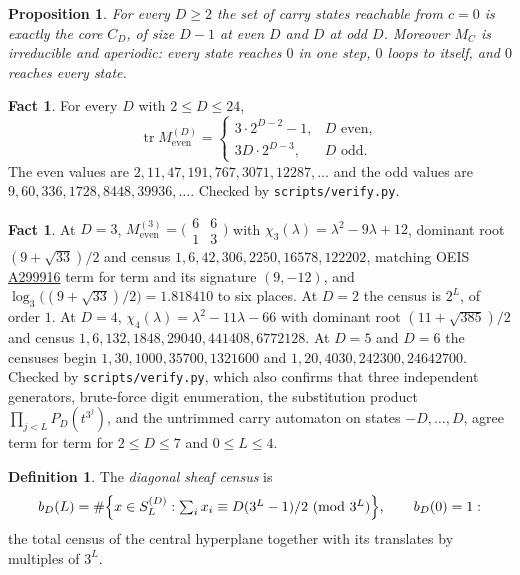 \documentclass[11pt]{amsart}
\newtheorem{proposition}[theorem]{Proposition}
\theoremstyle{definition}
\newtheorem{definition}[theorem]{Definition}
\newtheorem{fact}[theorem]{Fact}
\theoremstyle{remark}
\begin{document}
\begin{proposition}
\label{prop:reach}
For every $D \ge 2$ the set of carry states reachable from $c = 0$ is exactly the core $C_D$, of size $D-1$ at even $D$ and $D$ at odd $D$. Moreover $M_C$ is irreducible and aperiodic: every state reaches $0$ in one step, $0$ loops to itself, and $0$ reaches every state.
\end{proposition}

\begin{fact}
\label{fact:trace}
For every $D$ with $2 \le D \le 24$,
\[
\operatorname{tr} M_{\mathrm{even}}^{(D)} =
\begin{cases}
3 \cdot 2^{D-2} - 1, & D \text{ even}, \\
3D \cdot 2^{D-3}, & D \text{ odd}.
\end{cases}
\]
The even values are $2, 11, 47, 191, 767, 3071, 12287, \dots$ and the odd values are $9, 60, 336, 1728, 8448, 39936, \dots$. Checked by \texttt{scripts/verify.py}.
\end{fact}

\begin{fact}
\label{fact:anchor}
At $D = 3$, $M_{\mathrm{even}}^{(3)} = \bigl(\begin{smallmatrix} 6 & 6 \\ 1 & 3 \end{smallmatrix}\bigr)$ with $\chi_3(\lambda) = \lambda^2 - 9\lambda + 12$, dominant root $(9+\sqrt{33})/2$ and census $1, 6, 42, 306, 2250, 16578, 122202$, matching OEIS \href{https://oeis.org/A299916}{A299916} term for term and its signature $(9,-12)$, and $\log_3\bigl((9+\sqrt{33})/2\bigr) = 1.818410$ to six places. At $D = 2$ the census is $2^L$, of order $1$. At $D = 4$, $\chi_4(\lambda) = \lambda^2 - 11\lambda - 66$ with dominant root $(11+\sqrt{385})/2$ and census $1, 6, 132, 1848, 29040, 441408, 6772128$. At $D = 5$ and $D = 6$ the censuses begin $1, 30, 1000, 35700, 1321600$ and $1, 20, 4030, 242300, 24642700$. Checked by \texttt{scripts/verify.py}, which also confirms that three independent generators, brute-force digit enumeration, the substitution product $\prod_{j<L} P_D(t^{3^j})$, and the untrimmed carry automaton on states $-D,\dots,D$, agree term for term for $2 \le D \le 7$ and $0 \le L \le 4$.
\end{fact}

\begin{definition}
\label{def:sheaf}
The \emph{diagonal sheaf census} is
\[
b_D(L) = \#\Bigl\{ x \in S_L^{(D)} : \textstyle\sum_i x_i \equiv D(3^L-1)/2 \ (\mathrm{mod}\ 3^L) \Bigr\}, \qquad b_D(0) = 1 :
\]
the total census of the central hyperplane together with its translates by multiples of $3^L$.
\end{definition}
\end{document}

